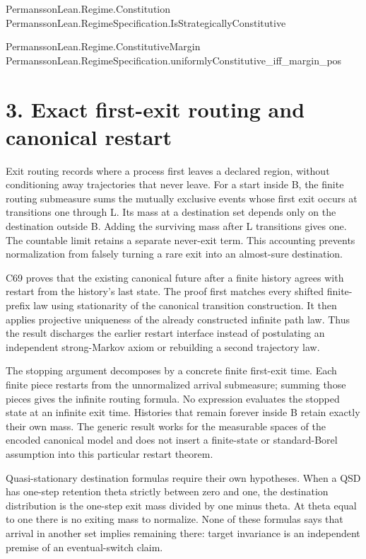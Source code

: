 \documentclass[11pt,a4paper]{article}
\begin{document}
{\footnotesize\raggedright PermanssonLe\allowbreak{}an.Regime.Co\allowbreak{}nstitution\\ PermanssonLe\allowbreak{}an.RegimeSpe\allowbreak{}cification.I\allowbreak{}sStrategical\allowbreak{}lyConstituti\allowbreak{}ve\par}
{\footnotesize\raggedright PermanssonLe\allowbreak{}an.Regime.Co\allowbreak{}nstitutiveMa\allowbreak{}rgin\\ PermanssonLe\allowbreak{}an.RegimeSpe\allowbreak{}cification.u\allowbreak{}niformlyCons\allowbreak{}titutive\_iff\allowbreak{}\_margin\_pos\par}
\section{3. Exact first-exit routing and canonical restart}
Exit routing records where a process first leaves a declared region, without conditioning away trajectories that never leave. For a start inside B, the finite routing submeasure sums the mutually exclusive events whose first exit occurs at transitions one through L. Its mass at a destination set depends only on the destination outside B. Adding the surviving mass after L transitions gives one. The countable limit retains a separate never-exit term. This accounting prevents normalization from falsely turning a rare exit into an almost-sure destination.

C69 proves that the existing canonical future after a finite history agrees with restart from the history's last state. The proof first matches every shifted finite-prefix law using stationarity of the canonical transition construction. It then applies projective uniqueness of the already constructed infinite path law. Thus the result discharges the earlier restart interface instead of postulating an independent strong-Markov axiom or rebuilding a second trajectory law.

The stopping argument decomposes by a concrete finite first-exit time. Each finite piece restarts from the unnormalized arrival submeasure; summing those pieces gives the infinite routing formula. No expression evaluates the stopped state at an infinite exit time. Histories that remain forever inside B retain exactly their own mass. The generic result works for the measurable spaces of the encoded canonical model and does not insert a finite-state or standard-Borel assumption into this particular restart theorem.

Quasi-stationary destination formulas require their own hypotheses. When a QSD has one-step retention theta strictly between zero and one, the destination distribution is the one-step exit mass divided by one minus theta. At theta equal to one there is no exiting mass to normalize. None of these formulas says that arrival in another set implies remaining there: target invariance is an independent premise of an eventual-switch claim.
\end{document}
